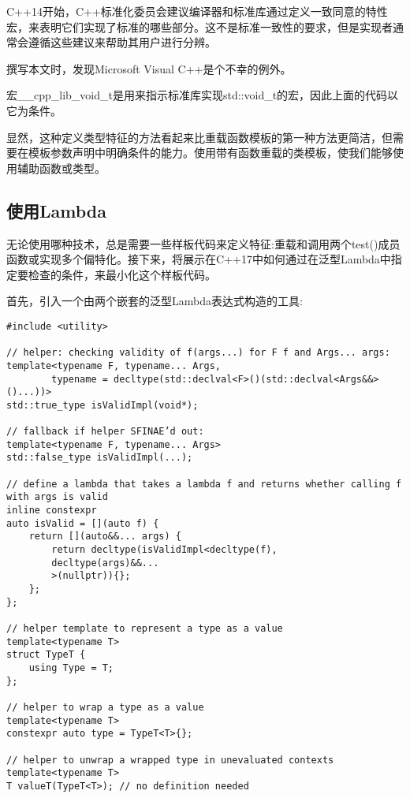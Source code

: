 C++14开始，C++标准化委员会建议编译器和标准库通过定义一致同意的特性宏，来表明它们实现了标准的哪些部分。这不是标准一致性的要求，但是实现者通常会遵循这些建议来帮助其用户进行分辨。

\begin{tcolorbox}[colback=webgreen!5!white,colframe=webgreen!75!black]
\hspace*{0.75cm}撰写本文时，发现Microsoft Visual C++是个不幸的例外。
\end{tcolorbox}

宏\_\_cpp\_lib\_void\_t是用来指示标准库实现std::void\_t的宏，因此上面的代码以它为条件。

显然，这种定义类型特征的方法看起来比重载函数模板的第一种方法更简洁，但需要在模板参数声明中明确条件的能力。使用带有函数重载的类模板，使我们能够使用辅助函数或类型。

\subsection{使用Lambda}

无论使用哪种技术，总是需要一些样板代码来定义特征:重载和调用两个test()成员函数或实现多个偏特化。接下来，将展示在C++17中如何通过在泛型Lambda中指定要检查的条件，来最小化这个样板代码。

首先，引入一个由两个嵌套的泛型Lambda表达式构造的工具:

\begin{lstlisting}[style=styleCXX]
#include <utility>

// helper: checking validity of f(args...) for F f and Args... args:
template<typename F, typename... Args,
		typename = decltype(std::declval<F>()(std::declval<Args&&>()...))>
std::true_type isValidImpl(void*);

// fallback if helper SFINAE’d out:
template<typename F, typename... Args>
std::false_type isValidImpl(...);

// define a lambda that takes a lambda f and returns whether calling f with args is valid
inline constexpr
auto isValid = [](auto f) {
	return [](auto&&... args) {
		return decltype(isValidImpl<decltype(f),
		decltype(args)&&...
		>(nullptr)){};
	};
};

// helper template to represent a type as a value
template<typename T>
struct TypeT {
	using Type = T;
};

// helper to wrap a type as a value
template<typename T>
constexpr auto type = TypeT<T>{};

// helper to unwrap a wrapped type in unevaluated contexts
template<typename T>
T valueT(TypeT<T>); // no definition needed
\end{lstlisting}

